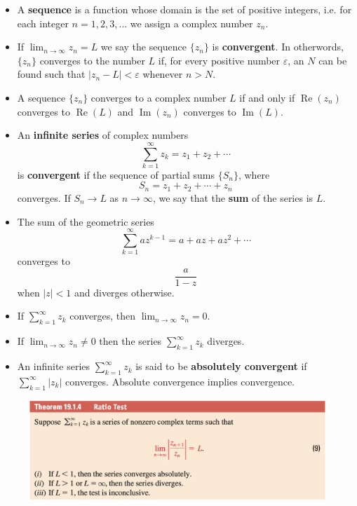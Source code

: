 \documentclass{article}
\renewcommand{\Im}{\operatorname{Im}}
\renewcommand{\Re}{\operatorname{Re}}
\begin{document}
\begin{itemize}
  \item A \textbf{sequence} is a function whose domain is the set of positive integers, i.e. for each integer $n = 1, 2, 3, \ldots$ we assign a complex number $z_n$.

  \item If $\lim_{n \rightarrow \infty} z_n = L$ we say the sequence $\{ z_n \}$ is \textbf{convergent}. In otherwords, $\{ z_n \}$ converges to the number $L$ if, for every positive number $\varepsilon$, an $N$ can be found such that $|z_n - L| < \varepsilon$ whenever $n > N$.

  \item A sequence $\{ z_n \}$ converges to a complex number $L$ if and only if $\Re (z_n)$ converges to $\Re (L)$ and $\Im (z_n)$ converges to $\Im (L)$.

  \item An \textbf{infinite series} of complex numbers \[\sum_{k = 1}^\infty z_k = z_1 + z_2 + \cdots\] is \textbf{convergent} if the sequence of partial sums $\{ S_n \}$, where \[S_n = z_1 + z_2 + \cdots + z_n\] converges. If $S_n \rightarrow L$ as $n \rightarrow \infty$, we say that the \textbf{sum} of the series is $L$.

  \item The sum of the geometric series \[\sum_{k = 1}^\infty a z^{k - 1} = a + a z + a z^2 + \cdots\] converges to \[\frac{a}{1 - z}\] when $|z| < 1$ and diverges otherwise.

  \item If $\sum_{k = 1}^\infty z_k$ converges, then $\lim_{n \rightarrow \infty} z_n = 0$.

  \item If $\lim_{n \rightarrow \infty} z_n \ne 0$ then the series $\sum_{k = 1}^\infty z_k$ diverges.

  \item An infinite series $\sum_{k = 1}^\infty z_k$ is said to be \textbf{absolutely convergent} if \\ $\sum_{k = 1}^\infty |z_k|$ converges. Absolute convergence implies convergence.
\end{itemize}

\begin{figure}[H]
  \centering
  \includegraphics[width=\textwidth]{ratio-test}
\end{figure}
\end{document}
